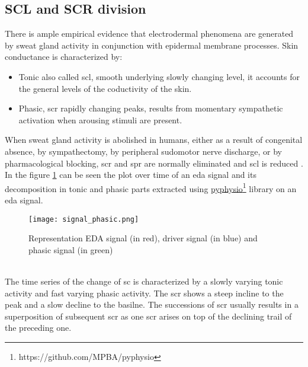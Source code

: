 \subsection{SCL and SCR division}
There is ample empirical evidence that electrodermal phenomena are generated by sweat gland activity in conjunction with epidermal membrane processes. Skin conductance is characterized by:
\begin{itemize}
	\item Tonic also called \gls{scl}, smooth underlying slowly changing level, it accounts for the general levels of the coductivity of the skin.
	\item Phasic, \gls{scr} rapidly changing peaks, results from momentary sympathetic activation when arousing stimuli are present.
\end{itemize}
When sweat gland activity is abolished in humans, either as a result of congenital absence, by sympathectomy, by peripheral sudomotor nerve discharge, or by pharmacological blocking, \gls{scr} and \gls{spr} are normally eliminated and \gls{scl} is reduced \cite{fowles1993electrodermal}.
\\ \indent
In the figure \ref{fig:signal_phasic} can be seen the plot over time of an \gls{eda} signal and its decomposition in tonic and phasic parts extracted using  \href{https://github.com/MPBA/pyphysio}{pyphysio}\footnote{https://github.com/MPBA/pyphysio} library \cite{bizzego2019pyphysio} on an \gls{eda} signal. 
\begin{figure}[h]
    \centering
    \texttt{[image: signal\_phasic.png]} 
	\caption{Representation EDA signal (in red), driver signal (in blue) and phasic signal (in green)}
    \label{fig:signal_phasic}
\end{figure}
\\
The time series of the change of \gls{sc} is characterized by a slowly varying tonic activity and fast varying phasic activity. The \gls{scr} shows a steep incline to the peak and a slow decline to the basilne. The successions of \gls{scr} usually results in a superposition of subsequent \gls{scr} as one \gls{scr} arises on top of the declining trail of the preceding one.

